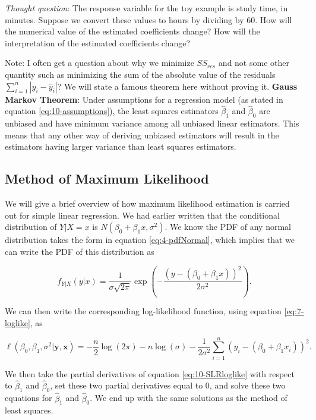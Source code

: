 \documentclass[
]{book}
\begin{document}
\emph{Thought question}: The response variable for the toy example is study time, in minutes. Suppose we convert these values to hours by dividing by 60. How will the numerical value of the estimated coefficients change? How will the interpretation of the estimated coefficients change?

Note: I often get a question about why we minimize \(SS_{res}\) and not some other quantity such as minimizing the sum of the absolute value of the residuals \(\sum_{i=1}^n |y_i - \hat{y}_i|\)? We will state a famous theorem here without proving it. \textbf{Gauss Markov Theorem}: Under assumptions for a regression model (as stated in equation \eqref{eq:10-assumptions}), the least squares estimators \(\hat{\beta}_1\) and \(\hat{\beta}_0\) are unbiased and have minimum variance among all unbiased linear estimators. This means that any other way of deriving unbiased estimators will result in the estimators having larger variance than least squares estimators.

\hypertarget{method-of-maximum-likelihood}{%
\subsection{Method of Maximum Likelihood}\label{method-of-maximum-likelihood}}

We will give a brief overview of how maximum likelihood estimation is carried out for simple linear regression. We had earlier written that the conditional distribution of \(Y|X=x\) is \(N(\beta_0+\beta_{1} x, \sigma^2)\). We know the PDF of any normal distribution takes the form in equation \eqref{eq:4-pdfNormal}, which implies that we can write the PDF of this distribution as

\begin{equation} 
f_{Y|X}(y|x) = \frac{1}{\sigma \sqrt{2 \pi}} \exp \left(-\frac{(y - (\beta_0+\beta_{1} x))^2}{2 \sigma^2} \right).
\label{eq:10-SLRpdf}
\end{equation}

We can then write the corresponding log-likelihood function, using equation \eqref{eq:7-loglike}, as

\begin{equation}
\ell(\beta_0, \beta_1, \sigma^2 | \boldsymbol{y}, \boldsymbol{x}) = -\frac{n}{2} \log(2\pi) - n \log(\sigma) - \frac{1}{2 \sigma^2} \sum_{i=1}^n \left(y_i - (\beta_0 + \beta_1 x_i) \right)^2.
\label{eq:10-SLRloglike}
\end{equation}

We then take the partial derivatives of equation \eqref{eq:10-SLRloglike} with respect to \(\hat{\beta}_1\) and \(\hat{\beta}_0\), set these two partial derivatives equal to 0, and solve these two equations for \(\hat{\beta}_1\) and \(\hat{\beta}_0\). We end up with the same solutions as the method of least squares.
\end{document}
